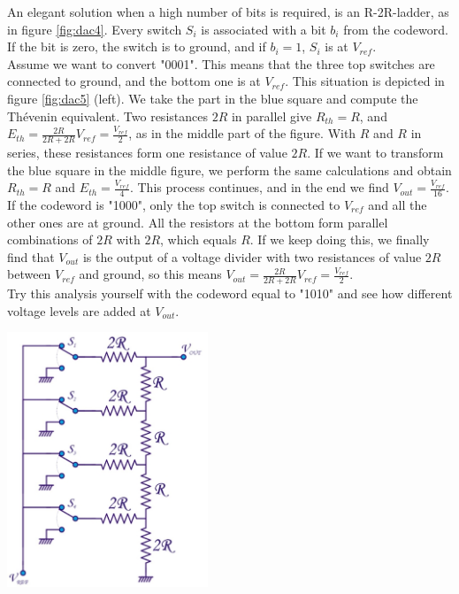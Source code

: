 \begin{minipage}{.7\textwidth}
	An elegant solution when a high number of bits is required, is an R-2R-ladder, as in figure \ref{fig:dac4}. Every switch $S_i$ is associated with a bit $b_i$ from the codeword. If the bit is zero, the switch is to ground, and if $b_i = 1$, $S_i$ is at $V_{ref}$.\\
	Assume we want to convert "0001". This means that the three top switches are connected to ground, and the bottom one is at $V_{ref}$. This situation is depicted in figure \ref{fig:dac5} (left). We take the part in the blue square and compute the Thévenin equivalent. Two resistances $2R$ in parallel give $R_{th} = R$, and $E_{th} = \frac{2R}{2R+2R} V_{ref} = \frac{V_{ref}}{2}$, as in the middle part of the figure. With $R$ and $R$ in series, these resistances form one resistance of value $2R$. If we want to transform the blue square in the middle figure, we perform the same calculations and obtain $R_{th} = R$ and $E_{th} = \frac{V_{ref}}{4}$. This process continues, and in the end we find $V_{out} = \frac{V_{ref}}{16}$.\\
	If the codeword is "1000", only the top switch is connected to $V_{ref}$ and all the other ones are at ground. All the resistors at the bottom form parallel combinations of $2R$ with $2R$, which equals $R$. If we keep doing this, we finally find that $V_{out}$ is the output of a voltage divider with two resistances of value $2R$ between $V_{ref}$ and ground, so this means $V_{out} = \frac{2R}{2R + 2R} V_{ref} = \frac{V_{ref}}{2}$.\\
	Try this analysis yourself with the codeword equal to "1010" and see how different voltage levels are added at $V_{out}$.
\end{minipage}
\begin{minipage}{.3\textwidth}
	\centering
	\includegraphics[width=6cm]{figures/ch18/dac4.jpg}
	\label{fig:dac4}
\end{minipage}%

